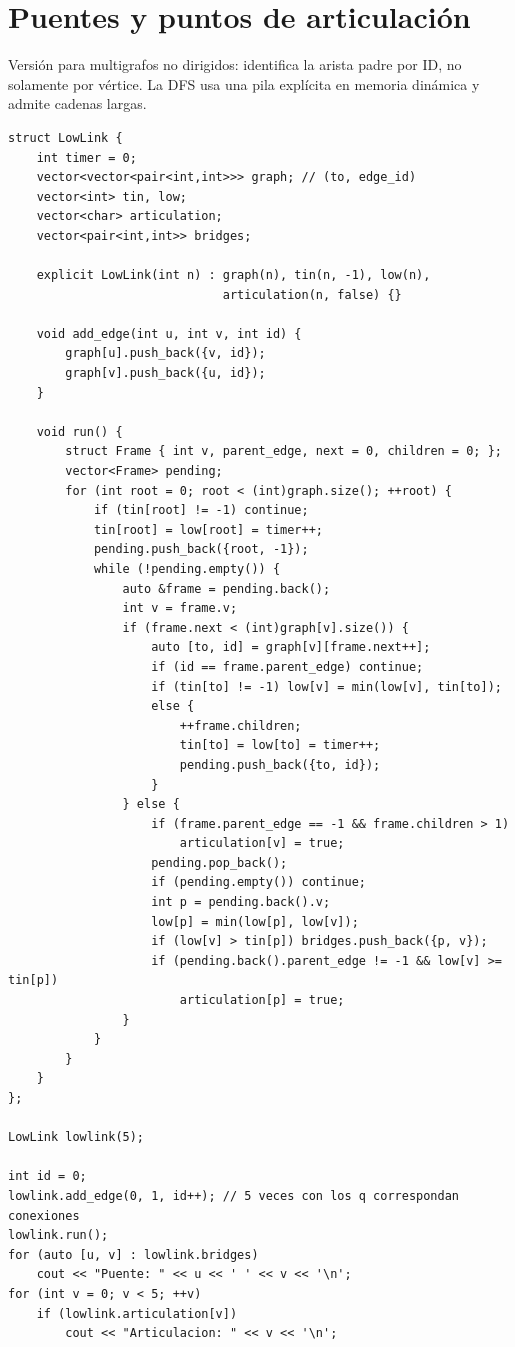 \section{Puentes y puntos de articulaci\'on}

Versi\'on para multigrafos no dirigidos: identifica la arista padre por ID, no
solamente por v\'ertice.
La DFS usa una pila expl\'icita en memoria din\'amica y admite cadenas largas.

\begin{lstlisting}[style=cpp]
struct LowLink {
    int timer = 0;
    vector<vector<pair<int,int>>> graph; // (to, edge_id)
    vector<int> tin, low;
    vector<char> articulation;
    vector<pair<int,int>> bridges;

    explicit LowLink(int n) : graph(n), tin(n, -1), low(n),
                              articulation(n, false) {}

    void add_edge(int u, int v, int id) {
        graph[u].push_back({v, id});
        graph[v].push_back({u, id});
    }

    void run() {
        struct Frame { int v, parent_edge, next = 0, children = 0; };
        vector<Frame> pending;
        for (int root = 0; root < (int)graph.size(); ++root) {
            if (tin[root] != -1) continue;
            tin[root] = low[root] = timer++;
            pending.push_back({root, -1});
            while (!pending.empty()) {
                auto &frame = pending.back();
                int v = frame.v;
                if (frame.next < (int)graph[v].size()) {
                    auto [to, id] = graph[v][frame.next++];
                    if (id == frame.parent_edge) continue;
                    if (tin[to] != -1) low[v] = min(low[v], tin[to]);
                    else {
                        ++frame.children;
                        tin[to] = low[to] = timer++;
                        pending.push_back({to, id});
                    }
                } else {
                    if (frame.parent_edge == -1 && frame.children > 1)
                        articulation[v] = true;
                    pending.pop_back();
                    if (pending.empty()) continue;
                    int p = pending.back().v;
                    low[p] = min(low[p], low[v]);
                    if (low[v] > tin[p]) bridges.push_back({p, v});
                    if (pending.back().parent_edge != -1 && low[v] >= tin[p])
                        articulation[p] = true;
                }
            }
        }
    }
};

LowLink lowlink(5);

int id = 0;
lowlink.add_edge(0, 1, id++); // 5 veces con los q correspondan conexiones
lowlink.run();
for (auto [u, v] : lowlink.bridges)
    cout << "Puente: " << u << ' ' << v << '\n';
for (int v = 0; v < 5; ++v)
    if (lowlink.articulation[v])
        cout << "Articulacion: " << v << '\n';
\end{lstlisting}

